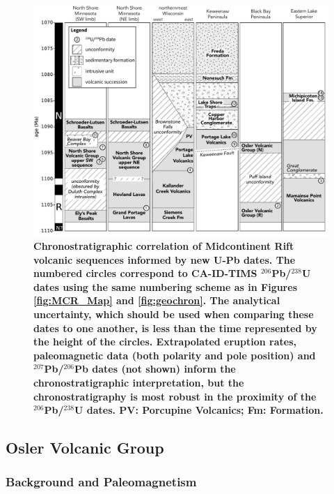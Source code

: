 \documentclass[11pt,letterpaper]{article}
\begin{document}
\begin{figure}
\centering
\includegraphics[width=6.5 in]{Figures/Fig3_MCR_chronostrat.pdf}
\caption{\small{\textbf{Chronostratigraphic correlation of Midcontinent Rift volcanic sequences informed by new U-Pb dates. The numbered circles correspond to CA-ID-TIMS $^{206}$Pb/$^{238}$U dates using the same numbering scheme as in Figures \ref{fig:MCR_Map} and \ref{fig:geochron}. The analytical uncertainty, which should be used when comparing these dates to one another, is less than the time represented by the height of the circles. Extrapolated eruption rates, paleomagnetic data (both polarity and pole position) and $^{207}$Pb/$^{206}$Pb dates (not shown) inform the chronostratigraphic interpretation, but the chronostratigraphy is most robust in the proximity of the $^{206}$Pb/$^{238}$U dates. PV: Porcupine Volcanics; Fm: Formation.}}}
\label{fig:chronostrat}
\end{figure}

\subsection{Osler Volcanic Group}

\subsubsection{Background and Paleomagnetism}
\end{document}
